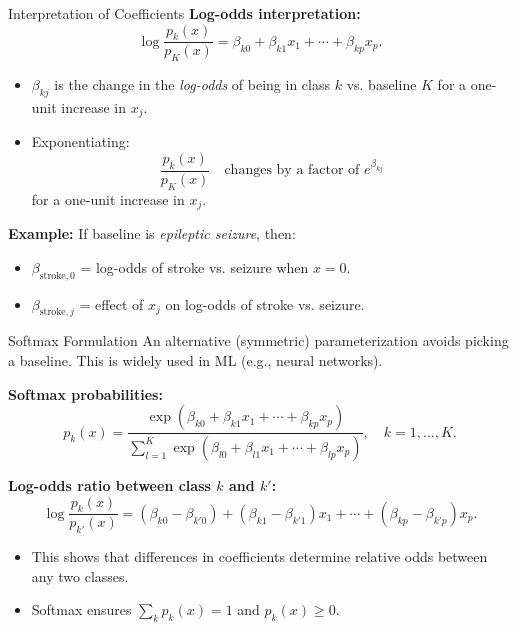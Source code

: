 \documentclass[../../generative_classifiers.tex]{subfiles}
\begin{document}
\begin{frame}{Interpretation of Coefficients}
\small
\textbf{Log-odds interpretation:}
\[
\log \frac{p_k(x)}{p_K(x)} = \beta_{k0} + \beta_{k1}x_1 + \cdots + \beta_{kp}x_p.
\]

\begin{itemize}
    \item $\beta_{kj}$ is the change in the \emph{log-odds} of being in class $k$ vs. baseline $K$ for a one-unit increase in $x_j$.
    \item Exponentiating:
    \[
    \frac{p_k(x)}{p_K(x)} \quad \text{changes by a factor of } e^{\beta_{kj}}
    \]
    for a one-unit increase in $x_j$.
\end{itemize}

\textbf{Example:}  
If baseline is \emph{epileptic seizure}, then:
\begin{itemize}
    \item $\beta_{\text{stroke},0}$ = log-odds of stroke vs. seizure when $x=0$.
    \item $\beta_{\text{stroke},j}$ = effect of $x_j$ on log-odds of stroke vs. seizure.
\end{itemize}
\end{frame}

\begin{frame}{Softmax Formulation}
\small
An alternative (symmetric) parameterization avoids picking a baseline.  
This is widely used in ML (e.g., neural networks).

\textbf{Softmax probabilities:}
\[
p_k(x) = \frac{\exp(\beta_{k0} + \beta_{k1}x_1 + \cdots + \beta_{kp}x_p)}
{\sum_{l=1}^{K} \exp(\beta_{l0} + \beta_{l1}x_1 + \cdots + \beta_{lp}x_p)},
\quad k=1,\dots,K.
\]

\textbf{Log-odds ratio between class $k$ and $k'$:}
\[
\log \frac{p_k(x)}{p_{k'}(x)} =
(\beta_{k0} - \beta_{k'0}) + (\beta_{k1}-\beta_{k'1})x_1 + \cdots + (\beta_{kp}-\beta_{k'p})x_p.
\]

\begin{itemize}
    \item This shows that differences in coefficients determine relative odds between any two classes.
    \item Softmax ensures $\sum_k p_k(x)=1$ and $p_k(x)\geq 0$.
\end{itemize}
\end{frame}
\end{document}
